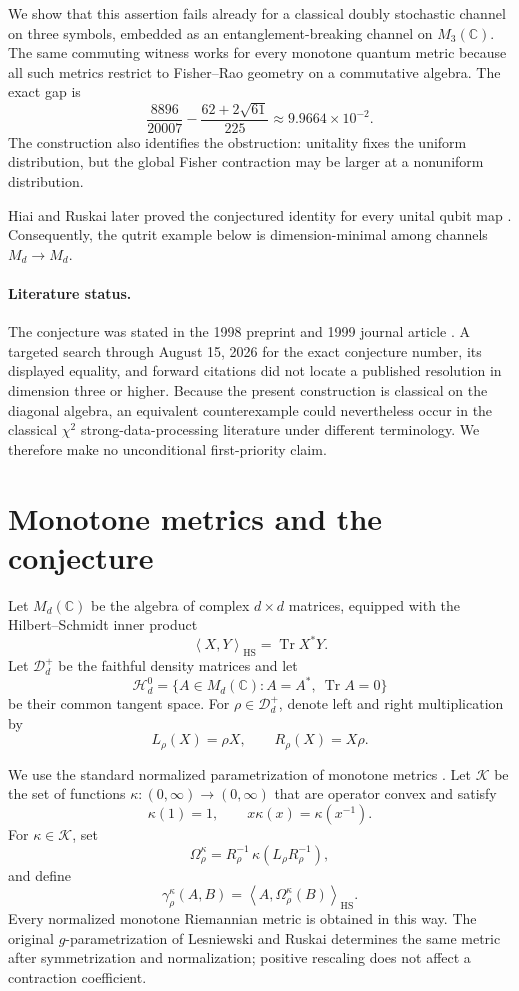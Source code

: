 \documentclass[11pt]{amsart}
\theoremstyle{definition}
\theoremstyle{remark}
\DeclareMathOperator{\Tr}{Tr}
\newcommand{\Md}{M_d(\mathbb C)}
\newcommand{\Dplus}{\mathcal D_d^{+}}
\newcommand{\Htr}{\mathcal H_d^{0}}
\newcommand{\HS}{\mathrm{HS}}
\newcommand{\ip}[2]{\left\langle #1,#2\right\rangle_{\HS}}
\begin{document}
We show that this assertion fails already for a classical doubly stochastic channel on three symbols, embedded as an entanglement-breaking channel on $M_3(\mathbb C)$. The same commuting witness works for every monotone quantum metric because all such metrics restrict to Fisher--Rao geometry on a commutative algebra. The exact gap is
\[
 \frac{8896}{20007}
 -\frac{62+2\sqrt{61}}{225}
 \approx 9.9664\times10^{-2}.
\]
The construction also identifies the obstruction: unitality fixes the uniform distribution, but the global Fisher contraction may be larger at a nonuniform distribution.

Hiai and Ruskai later proved the conjectured identity for every unital qubit map \cite{HR2016}. Consequently, the qutrit example below is dimension-minimal among channels $M_d\to M_d$.

\paragraph{Literature status.}
The conjecture was stated in the 1998 preprint and 1999 journal article \cite{LR1999}. A targeted search through August 15, 2026 for the exact conjecture number, its displayed equality, and forward citations did not locate a published resolution in dimension three or higher. Because the present construction is classical on the diagonal algebra, an equivalent counterexample could nevertheless occur in the classical $\chi^2$ strong-data-processing literature under different terminology. We therefore make no unconditional first-priority claim.

\section{Monotone metrics and the conjecture}

Let $\Md$ be the algebra of complex $d\times d$ matrices, equipped with the Hilbert--Schmidt inner product
\[
 \ip{X}{Y}=\Tr X^*Y.
\]
Let $\Dplus$ be the faithful density matrices and let
\[
 \Htr=\{A\in\Md:A=A^*,\ \Tr A=0\}
\]
be their common tangent space. For $\rho\in\Dplus$, denote left and right multiplication by
\[
 L_\rho(X)=\rho X,
 \qquad
 R_\rho(X)=X\rho.
\]

We use the standard normalized parametrization of monotone metrics \cite{Petz1996,PetzSudar1996,HR2016}. Let $\mathcal K$ be the set of functions $\kappa:(0,\infty)\to(0,\infty)$ that are operator convex and satisfy
\[
 \kappa(1)=1,
 \qquad
 x\kappa(x)=\kappa(x^{-1}).
\]
For $\kappa\in\mathcal K$, set
\begin{equation}\label{eq:omega}
 \Omega_\rho^\kappa
 =R_\rho^{-1}\,\kappa(L_\rho R_\rho^{-1}),
\end{equation}
and define
\begin{equation}\label{eq:metric}
 \gamma_\rho^\kappa(A,B)
 =\ip{A}{\Omega_\rho^\kappa(B)}.
\end{equation}
Every normalized monotone Riemannian metric is obtained in this way. The original $g$-parametrization of Lesniewski and Ruskai determines the same metric after symmetrization and normalization; positive rescaling does not affect a contraction coefficient.
\end{document}
